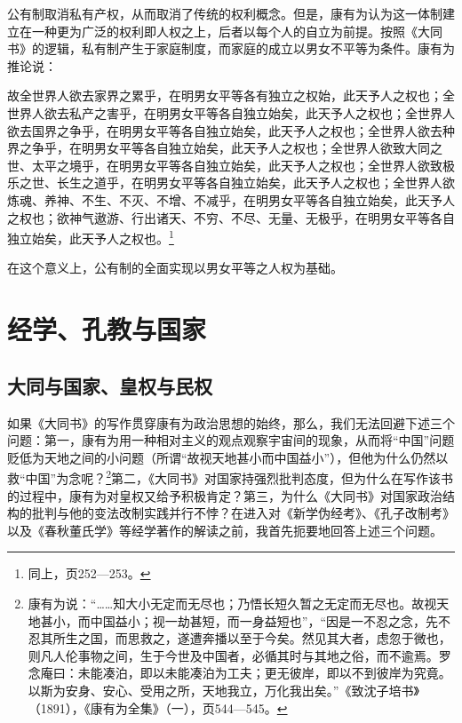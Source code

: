 \documentclass[a4paper, 12pt, openright]{ctexbook}
\renewenvironment{quote}
  {\list{}{\rightmargin2\ccwd \leftmargin2\ccwd \itemindent=2\ccwd \listparindent=2\ccwd}%
   \item\relax\small\kaishu\color{black}}
  {\endlist}
\begin{document}
公有制取消私有产权，从而取消了传统的权利概念。但是，康有为认为这一体制建立在一种更为广泛的权利即人权之上，后者以每个人的自立为前提。按照《大同书》的逻辑，私有制产生于家庭制度，而家庭的成立以男女不平等为条件。康有为推论说：

\begin{quote}
故全世界人欲去家界之累乎，在明男女平等各有独立之权始，此天予人之权也；全世界人欲去私产之害乎，在明男女平等各自独立始矣，此天予人之权也；全世界人欲去国界之争乎，在明男女平等各自独立始矣，此天予人之权也；全世界人欲去种界之争乎，在明男女平等各自独立始矣，此天予人之权也；全世界人欲致大同之世、太平之境乎，在明男女平等各自独立始矣，此天予人之权也；全世界人欲致极乐之世、长生之道乎，在明男女平等各自独立始矣，此天予人之权也；全世界人欲炼魂、养神、不生、不灭、不增、不减乎，在明男女平等各自独立始矣，此天予人之权也；欲神气遨游、行出诸天、不穷、不尽、无量、无极乎，在明男女平等各自独立始矣，此天予人之权也。\footnote{同上，页252—253。}
\end{quote}

在这个意义上，公有制的全面实现以男女平等之人权为基础。

\section{经学、孔教与国家}

\subsection{大同与国家、皇权与民权}

如果《大同书》的写作贯穿康有为政治思想的始终，那么，我们无法回避下述三个问题：第一，康有为用一种相对主义的观点观察宇宙间的现象，从而将“中国”问题贬低为天地之间的小问题（所谓“故视天地甚小而中国益小”），但他为什么仍然以救“中国”为念呢？\footnote{康有为说：“……知大小无定而无尽也；乃悟长短久暂之无定而无尽也。故视天地甚小，而中国益小；视一劫甚短，而一身益短也”，“因是一不忍之念，先不忍其所生之国，而思救之，遂遭奔播以至于今矣。然见其大者，虑忽于微也，则凡人伦事物之间，生于今世及中国者，必循其时与其地之俗，而不逾焉。罗念庵曰：未能凑泊，即以未能凑泊为工夫；更无彼岸，即以不到彼岸为究竟。以斯为安身、安心、受用之所，天地我立，万化我出矣。”《致沈子培书》（1891），《康有为全集》（一），页544—545。}第二，《大同书》对国家持强烈批判态度，但为什么在写作该书的过程中，康有为对皇权又给予积极肯定？第三，为什么《大同书》对国家政治结构的批判与他的变法改制实践并行不悖？在进入对《新学伪经考》、《孔子改制考》以及《春秋董氏学》等经学著作的解读之前，我首先扼要地回答上述三个问题。
\end{document}
